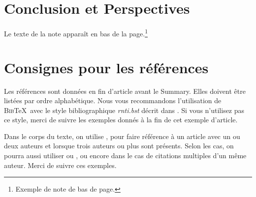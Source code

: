 \documentclass[a4paper,pagenum,french,showlayout]{rnti}
\begin{document}




\section{Conclusion et Perspectives}

Le texte de la note apparaît en bas de la page.\footnote{Exemple de
note de bas de page.}




\section{Consignes pour les références}

Les références sont données en fin d'article avant le
\guilo{}Summary\guilf{}. Elles doivent être listées par ordre
alphabétique.  Nous vous recommandons l'utilisation de
\textsc{Bib}\TeX\ avec le style bibliographique \textit{rnti.bst}
décrit dans \citet{ritschard:2005rnti}. Si vous n'utilisez pas ce
style, merci de suivre les exemples donnés à la fin de cet exemple
d'article.

Dans le corps du texte, on utilise \citet{thSau00}, \citet{HolWil90}
pour faire référence à un article avec un ou deux auteurs et
\citet{lioni01} lorsque trois auteurs ou plus sont présents.  Selon
les cas, on pourra aussi utiliser \citep{thSau00} ou
\citep[voir][chapitre 4]{brei:frie:olsh:ston:1984}, ou encore
\citet{quin:1986ID3,quin:1993} dans le cas de citations multiples
d'un même auteur. Merci de suivre ces exemples.






\appendix


\Fr
\end{document}
